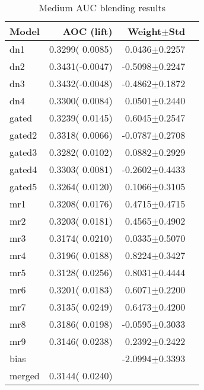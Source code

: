 \documentclass{article}
\begin{document}
\begin{table}[t]
\caption{Medium AUC blending results}
\label{problems}
\vskip 0.15in
\begin{center}
\begin{small}
\begin{sc}
\begin{tabular}{lrrr}
\hline
\abovespace\belowspace
Model & AOC (lift) & Weight$\pm$Std \\
\hline
\abovespace
dn1        & 0.3299( 0.0085) &  0.0436$\pm$0.2257 \\
dn2        & 0.3431(-0.0047) & -0.5098$\pm$0.2247 \\
dn3        & 0.3432(-0.0048) & -0.4862$\pm$0.1872 \\
dn4        & 0.3300( 0.0084) &  0.0501$\pm$0.2440 \\
\abovespace
gated      & 0.3239( 0.0145) &  0.6045$\pm$0.2547 \\
gated2     & 0.3318( 0.0066) & -0.0787$\pm$0.2708 \\
gated3     & 0.3282( 0.0102) &  0.0882$\pm$0.2929 \\
gated4     & 0.3303( 0.0081) & -0.2602$\pm$0.4433 \\
gated5     & 0.3264( 0.0120) &  0.1066$\pm$0.3105 \\
\abovespace
mr1        & 0.3208( 0.0176) &  0.4715$\pm$0.4715 \\
mr2        & 0.3203( 0.0181) &  0.4565$\pm$0.4902 \\
mr3        & 0.3174( 0.0210) &  0.0335$\pm$0.5070 \\
mr4        & 0.3196( 0.0188) &  0.8224$\pm$0.3427 \\
mr5        & 0.3128( 0.0256) &  0.8031$\pm$0.4444 \\
mr6        & 0.3201( 0.0183) &  0.6071$\pm$0.2200 \\
mr7        & 0.3135( 0.0249) &  0.6473$\pm$0.4200 \\
mr8        & 0.3186( 0.0198) & -0.0595$\pm$0.3033 \\
mr9        & 0.3146( 0.0238) &  0.2392$\pm$0.2422 \\
\abovespace
bias       &                 & -2.0994$\pm$0.3393 \\
\abovespace\belowspace
merged     & 0.3144( 0.0240) &                    \\
\hline
\end{tabular}
\end{sc}
\end{small}
\end{center}
\vskip -0.1in
\end{table}
\end{document}

